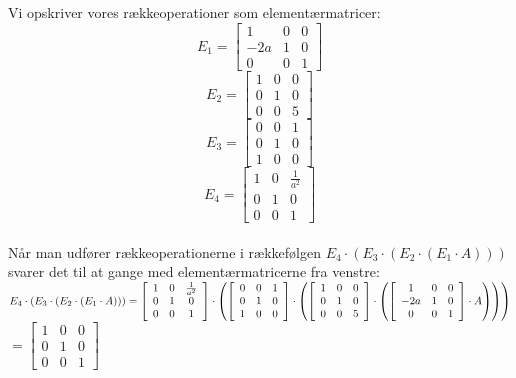 \documentclass[a4paper,12pt]{article}
\begin{document}
\subsection{}
Vi opskriver vores rækkeoperationer som elementærmatricer:\\
\[
E_1=
\left[\begin{array}{ccc}
    1 & 0 & 0 \\
    -2a & 1 & 0 \\
    0 & 0 & 1
\end{array}\right]
\]
\[
E_2=
\left[\begin{array}{ccc}
    1 & 0 & 0 \\
    0 & 1 & 0 \\
    0 & 0 & 5
\end{array}\right]
\]
\[
E_3=
\left[\begin{array}{ccc}
    0 & 0 & 1 \\
    0 & 1 & 0 \\
    1 & 0 & 0
\end{array}\right]
\]
\[
E_4=
\left[\begin{array}{ccc}
    1 & 0 & \frac{1}{a^2} \\
    0 & 1 & 0 \\
    0 & 0 & 1
\end{array}\right]
\]\\

Når man udfører række­operationerne i rækkefølgen $E_4 \cdot (E_3 \cdot (E_2 \cdot (E_1 \cdot A)))$ svarer det til at gange med elementærmatricerne fra venstre:\\

$
E_4 \cdot (E_3 \cdot (E_2 \cdot (E_1 \cdot A))) 
=
\left[\begin{array}{ccc}
    1 & 0 & \frac{1}{a^2} \\
    0 & 1 & 0 \\
    0 & 0 & 1
\end{array}\right]
\cdot \left( 
\left[\begin{array}{ccc}
    0 & 0 & 1 \\
    0 & 1 & 0 \\
    1 & 0 & 0
\end{array}\right]
\cdot \left( 
\left[\begin{array}{ccc}
    1 & 0 & 0 \\
    0 & 1 & 0 \\
    0 & 0 & 5
\end{array}\right]
\cdot \left( 
\left[\begin{array}{ccc}
    1 & 0 & 0 \\
    -2a & 1 & 0 \\
    0 & 0 & 1
\end{array}\right]
\cdot A\right)\right)\right)
$
$
=
\left[\begin{array}{ccc}
    1 & 0 & 0 \\
    0 & 1 & 0 \\
    0 & 0 & 1
\end{array}\right]
$\\
\end{document}
